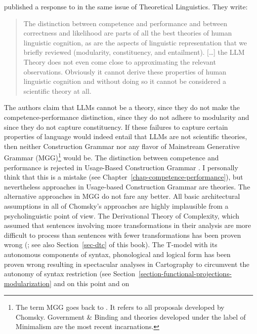 \citet{FoxKatzir2024a} published a response to \citeauthor{AmbridgeBlything2024a} in the same issue of
Theoretical Linguistics. They write:
\begin{quote}
The distinction between competence and performance and between correctness and likelihood are parts
of all the best theories of human linguistic cognition, as are the aspects of linguistic
representation that we briefly reviewed (modularity, constituency, and entailment). [\ldots]
the LLM Theory does not even come close to approximating the relevant observations. Obviously it
cannot derive these properties of human linguistic cognition and without doing so it cannot be
considered a scientific theory at all. \citep[]{FoxKatzir2024a}
\end{quote}
The authors claim that LLMs cannot be a theory, since they do not make the competence-performance
distinction, since they do not adhere to modularity and since they do not capture constituency. If
these failures to capture certain properties of language would indeed entail that LLMs are not
scientific theories, then neither Construction Grammar nor any flavor of Mainstream Generative
Grammar (MGG)\footnote{%
  The term MGG goes back to \citet[]{CJ2005a}. It refers to all proposals developed by
  Chomsky. Government \& Binding \citep{Chomsky81a} and theories developed under the label of
  Minimalism \citep{Chomsky95a-u} are the most recent incarnations. 
} would be. The distinction between competence and performance is rejected in
Usage-Based Construction Grammar \citep[]{Diessel2015a-u}. I personally think that this is
a mistake (see Chapter~\ref{chap-competence-performance}), but nevertheless approaches in Usage-based Construction
Grammar are theories. The alternative approaches in MGG do not fare any better. All basic
architectural assumptions in all of Chomsky's approaches are highly implausible from a
psycholinguistic point of view. The Derivational Theory of Complexity, which assumed that sentences
involving more transformations in their analysis are more difficult to process than sentences with
fewer transformations has been proven wrong (\citealt[--328]{FBG74a-u}; see also
Section~\ref{sec-dtc} of this book). The T-model with its autonomous components of 
syntax, phonological and logical form has been
proven wrong resulting in spectacular analyses in Cartography \citep{CR2010a} to circumvent the
autonomy of syntax restriction (see Section~\ref{section-functional-projections-modularization} and \citet[Section~4.10.2]{MuellerGermanic} on this point and on
